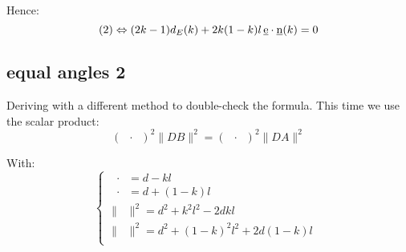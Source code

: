 \documentclass[10pt,a4paper]{article}
\newcommand{\ud}[1]{\underline{#1}}
\DeclareMathOperator{\DA}{\ud{DA}}
\DeclareMathOperator{\DB}{\ud{DB}}
\DeclareMathOperator{\n}{\ud{n}}
\DeclareMathOperator{\en}{\ud{e}\cdot\ud{n}}
\begin{document}
Hence:
$$
(2) \Leftrightarrow (2k - 1)d_E(k) + 2k(1-k)l\en(k) = 0\\
$$

\newpage
\subsection{equal angles 2}

Deriving with a different method to double-check the formula.
This time we use the scalar product:
$$
    (\DA\cdot\n)^2 \|DB\|^2 = (\DB\cdot\n)^2 \|DA\|^2
$$

With:
$$
\left\{
\begin{array}{ll}
    \DA\cdot\n = d - kl\en\\
    \DB\cdot\n = d + (1-k)l\en\\
    \|\DA\|^2 = d^2 + k^2l^2 - 2dkl\en\\
    \|\DB\|^2 = d^2 + (1-k)^2l^2 + 2d(1-k)l\en\\
\end{array}
\right.
$$
\end{document}
